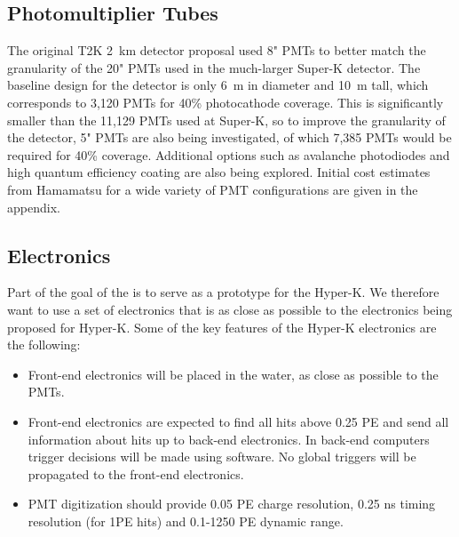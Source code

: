 \subsection{Photomultiplier Tubes}


The original T2K 2~km detector proposal used 8" PMTs to better match the granularity of the 20" PMTs used in the much-larger Super-K detector. The baseline design for the \nuprism detector is only 6~m in diameter and 10~m tall, which corresponds to 3,120 PMTs for 40\% photocathode coverage. This is significantly smaller than the 11,129 PMTs used at Super-K, so to improve the granularity of the detector, 5" PMTs are also being investigated, of which 7,385 PMTs would be required for 40\% coverage. Additional options such as avalanche photodiodes and high quantum efficiency coating are also being explored. Initial cost estimates from Hamamatsu for a wide variety of PMT configurations are given in the appendix.

\subsection{Electronics}


Part of the goal of the \nuprism is to serve as a prototype for the Hyper-K.
We therefore want \nuprism to use a set of electronics that is as close as possible to the
electronics being proposed for Hyper-K.  Some of the key features of the Hyper-K electronics 
are the following:

\begin{itemize}
\item Front-end electronics will be placed in the water, as close as possible to the PMTs.
\item Front-end electronics are expected to find all hits above 0.25 PE and send all information 
about hits up to back-end electronics.  In back-end computers trigger decisions will be made using software.
No global triggers will be propagated to the front-end electronics.  
\item PMT digitization should provide 0.05 PE charge resolution, 0.25 ns timing resolution (for 1PE hits) and
0.1-1250 PE dynamic range.
\end{itemize}

